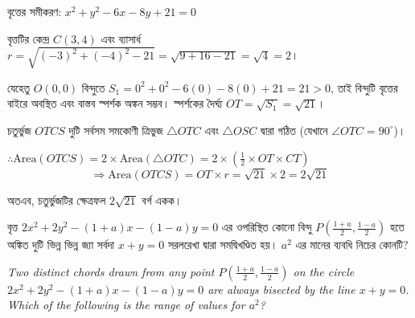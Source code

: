 \documentclass[12pt, a4paper]{article}
\begin{document}
\begin{tcolorbox}[solutionbox={সমাধান (Solution)}]
    \noindent
    বৃত্তের সমীকরণ: $x^2 + y^2 - 6x - 8y + 21 = 0$
    
    \vspace{0.5em}
    বৃত্তটির কেন্দ্র $C(3, 4)$ এবং ব্যাসার্ধ $r = \sqrt{(-3)^2 + (-4)^2 - 21} = \sqrt{9 + 16 - 21} = \sqrt{4} = 2$।
    
    \vspace{0.5em}
    যেহেতু $O(0, 0)$ বিন্দুতে $S_1 = 0^2 + 0^2 - 6(0) - 8(0) + 21 = 21 > 0$, তাই বিন্দুটি বৃত্তের বাইরে অবস্থিত এবং বাস্তব স্পর্শক অঙ্কন সম্ভব। স্পর্শকের দৈর্ঘ্য $OT = \sqrt{S_1} = \sqrt{21}$।
    
    \vspace{0.5em}
    চতুর্ভুজ $OTCS$ দুটি সর্বসম সমকোণী ত্রিভুজ $\triangle OTC$ এবং $\triangle OSC$ দ্বারা গঠিত (যেখানে $\angle OTC = 90^{\circ}$)।
    
    \vspace{0.5em}
    $\therefore \text{Area}(OTCS) = 2 \times \text{Area}(\triangle OTC) = 2 \times \left(\frac{1}{2} \times OT \times CT\right)$
    \[ \Rightarrow \text{Area}(OTCS) = OT \times r = \sqrt{21} \times 2 = 2\sqrt{21} \]
    
    \vspace{0.5em}
    অতএব, চতুর্ভুজটির ক্ষেত্রফল $2\sqrt{21}$ বর্গ একক।
\end{tcolorbox}

\vspace{2em}

\begin{tcolorbox}[questionbox={প্রশ্ন (Question) 6}]
    \noindent
    বৃত্ত $2x^2 + 2y^2 - (1+a)x - (1-a)y = 0$ এর ওপরিস্থিত কোনো বিন্দু $P\left(\frac{1+a}{2}, \frac{1-a}{2}\right)$ হতে অঙ্কিত দুটি ভিন্ন ভিন্ন জ্যা সর্বদা $x + y = 0$ সরলরেখা দ্বারা সমদ্বিখণ্ডিত হয়। $a^2$ এর মানের ব্যবধি নিচের কোনটি?
    
    \vspace{0.8em}
    \begin{english}
    \noindent\textit{\color{darkgray}
    Two distinct chords drawn from any point $P\left(\frac{1+a}{2}, \frac{1-a}{2}\right)$ on the circle $2x^2 + 2y^2 - (1+a)x - (1-a)y = 0$ are always bisected by the line $x + y = 0$. Which of the following is the range of values for $a^2$?
    }
    \end{english}
\end{tcolorbox}
\end{document}
